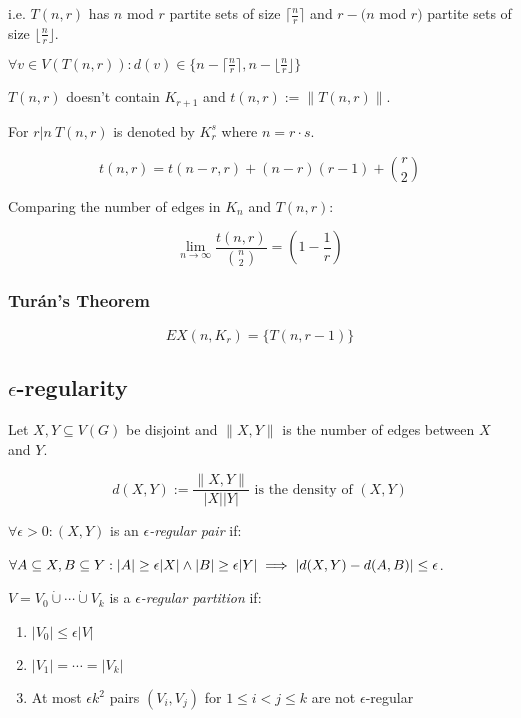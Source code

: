 \spacing

i.e. $T(n,r)$ has $n$ mod $r$ partite sets of size $\lceil\frac{n}{r}\rceil$ and $r - (n$ mod $r)$ partite sets of size $\lfloor\frac{n}{r}\rfloor$.

$\forall v \in V(T(n,r)) : d(v) \in \{ n - \lceil\frac{n}{r}\rceil, n - \lfloor\frac{n}{r}\rfloor \}$

\spacing

$T(n,r)$ doesn't contain $K_{r+1}$ and $t(n,r) := \|T(n,r)\|$.

For $r | n \ T(n,r)$ is denoted by $K_r^s$ where $n=r \cdot s$.

$$t(n,r) = t(n-r,r)+(n-r)(r-1)+{r \choose 2}$$

\spacing

Comparing the number of edges in $K_n$ and $T(n,r)$:

$$\lim_{n \to \infty} \frac{t(n,r)}{{n \choose 2}} = \left( 1-\frac{1}{r} \right)$$

\subsubsection*{Tur\'{a}n's Theorem}

$$EX(n,K_r) = \{T(n,r-1)\}$$

\subsection*{$\epsilon$-regularity}

Let $X, Y \subseteq V(G)$ be disjoint and $\|X,Y\|$ is the number of edges between $X$ and $Y$.

$$d(X,Y) := \frac{\|X,Y\|}{|X||Y|} \text{ is the density of $(X, Y)$}$$

$\forall \epsilon > 0 : (X,Y)$ is an \emph{$\epsilon$-regular pair} if:

$\forall A \subseteq X, B \subseteq Y : \\ |A| \geq \epsilon|X| \land |B| \geq \epsilon|Y| \implies |d(X,Y) - d(A,B)| \leq \epsilon$.

\spacing

$V=V_0 \dot\cup\cdots\dot\cup V_k$ is a \emph{$\epsilon$-regular partition} if:

\begin{enumerate}
	\item $|V_0| \leq \epsilon|V|$
	\item $|V_1| = \cdots = |V_k|$
	\item At most $\epsilon k^2$ pairs $(V_i,V_j)$ for $1 \leq i < j \leq k$ are not $\epsilon$-regular
\end{enumerate}

